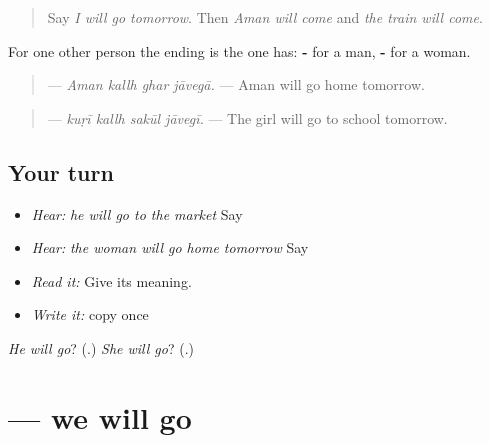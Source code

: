 \begin{quote}
Say \emph{I will go tomorrow}. Then \emph{Aman will come} and \emph{the train will come}.
\end{quote}

\begin{grammarlens}[title={Grammar Lens: like \pa{ਆਵੇਗਾ}}]
For one other person the ending is the one \textbf{} has: \textbf{-} for a man, \textbf{-} for a woman.

\begin{quote}
\textbf{   } — \emph{Aman kallh ghar jāvegā.} — Aman will go home tomorrow.
\end{quote}

\begin{quote}
\textbf{   } — \emph{kuṛī kallh sakūl jāvegī.} — The girl will go to school tomorrow.
\end{quote}
\end{grammarlens}

\subsection*{Your turn}
\begin{itemize}
\raggedright
  \item \emph{Hear:} \emph{he will go to the market} Say \textbf{  }
  \item \emph{Hear:} \emph{the woman will go home tomorrow} Say \textbf{   }
  \item \emph{Read it:} \textbf{   } Give its meaning.
  \item \emph{Write it:} copy \textbf{} once
\end{itemize}

\begin{tcolorbox}[breakable,colback=teal!4,colframe=teal!35!black,title={Before you move on}]
\emph{He will go}? (\textbf{}.) \emph{She will go}? (\textbf{}.)
\end{tcolorbox}
\section[\texorpdfstring{\pa{ਅਸੀਂ} \pa{ਜਾਵਾਂਗੇ} (asīṁ jāvāṅge)}{ਅਸੀਂ ਜਾਵਾਂਗੇ (asīṁ jāvāṅge)}]{  — we will go}

\label{lesson:PA-C221-javange}



